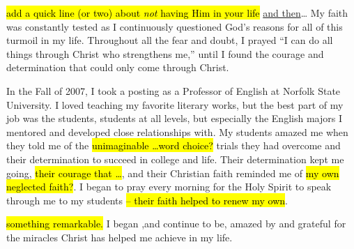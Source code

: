\documentclass{article}%
\begin{document}
\hl{add a quick line (or two) about \emph{not} having Him in your life} \ul{and then}\dots
My faith was constantly tested as I continuously questioned God's reasons for all of this turmoil in my life. 
Throughout all the fear and doubt, I prayed ``I can do all things through Christ who strengthens me,'' until I found the courage and determination that could only come through Christ. 

In the Fall of 2007, I took a posting as a Professor of English  at Norfolk State University. 
I loved teaching my favorite literary works, but the best part of my job was the students, students at all levels, but especially the English majors I mentored and developed close relationships with.
My students amazed me when they told me of the \hl{unimaginable  \dots word choice?} trials they had overcome and their determination to succeed in college and life. 
Their determination kept me going, \hl{their courage that \dots}, and their Christian faith reminded me of \hl{my own neglected faith?}. 
I began to pray every morning for the Holy Spirit to speak through me to my students \hl{-- their faith helped to renew my own}.  %

\hl{something remarkable.} I began ,and continue to be, amazed by and grateful for the miracles Christ has helped me achieve in my life. 


\end{document}
